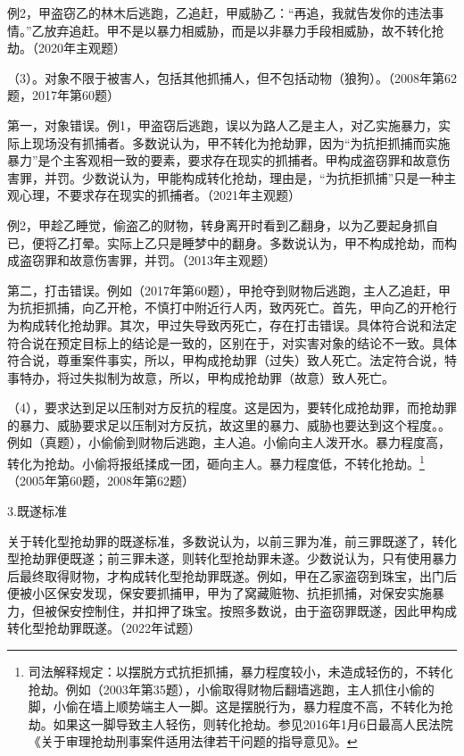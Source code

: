 例2，甲盗窃乙的林木后逃跑，乙追赶，甲威胁乙：“再追，我就告发你的违法事情。”乙放弃追赶。甲不是以暴力相威胁，而是以非暴力手段相威胁，故不转化抢劫。（2020年主观题）

（3）。对象不限于被害人，包括其他抓捕人，但不包括动物（狼狗）。（2008年第62题，2017年第60题）

第一，对象错误。例1，甲盗窃后逃跑，误以为路人乙是主人，对乙实施暴力，实际上现场没有抓捕者。多数说认为，甲不转化为抢劫罪，因为“为抗拒抓捕而实施暴力”是个主客观相一致的要素，要求存在现实的抓捕者。甲构成盗窃罪和故意伤害罪，并罚。少数说认为，甲能构成转化抢劫，理由是，“为抗拒抓捕”只是一种主观心理，不要求存在现实的抓捕者。（2021年主观题）

例2，甲趁乙睡觉，偷盗乙的财物，转身离开时看到乙翻身，以为乙要起身抓自已，便将乙打晕。实际上乙只是睡梦中的翻身。多数说认为，甲不构成抢劫，而构成盗窃罪和故意伤害罪，并罚。（2013年主观题）

第二，打击错误。例如（2017年第60题），甲抢夺到财物后逃跑，主人乙追赶，甲为抗拒抓捕，向乙开枪，不慎打中附近行人丙，致丙死亡。首先，甲向乙的开枪行为构成转化抢劫罪。其次，甲过失导致丙死亡，存在打击错误。具体符合说和法定符合说在预定目标上的结论是一致的，区别在于，对实害对象的结论不一致。具体符合说，尊重案件事实，所以，甲构成抢劫罪（过失）致人死亡。法定符合说，特事特办，将过失拟制为故意，所以，甲构成抢劫罪（故意）致人死亡。

（4），要求达到足以压制对方反抗的程度。这是因为，要转化成抢劫罪，而抢劫罪的暴力、威胁要求足以压制对方反抗，故这里的暴力、威胁也要达到这个程度。。例如（真题），小偷偷到财物后逃跑，主人追。小偷向主人泼开水。暴力程度高，转化为抢劫。小偷将报纸揉成一团，砸向主人。暴力程度低，不转化抢劫。\footnote{司法解释规定：以摆脱方式抗拒抓捕，暴力程度较小，未造成轻伤的，不转化抢劫。例如（2003年第35题），小偷取得财物后翻墙逃跑，主人抓住小偷的脚，小偷在墙上顺势端主人一脚。这是摆脱行为，暴力程度不高，不转化为抢劫。如果这一脚导致主人轻伤，则转化抢劫。参见2016年1月6日最高人民法院《关于审理抢劫刑事案件适用法律若干问题的指导意见》。}（2005年第60题，2008年第62题）

3.既遂标准

关于转化型抢劫罪的既遂标准，多数说认为，以前三罪为准，前三罪既遂了，转化型抢劫罪便既遂；前三罪未遂，则转化型抢劫罪未遂。少数说认为，只有使用暴力后最终取得财物，才构成转化型抢劫罪既遂。例如，甲在乙家盗窃到珠宝，出门后便被小区保安发现，保安要抓捕甲，甲为了窝藏赃物、抗拒抓捕，对保安实施暴力，但被保安控制住，并扣押了珠宝。按照多数说，由于盗窃罪既遂，因此甲构成转化型抢劫罪既遂。（2022年试题）

